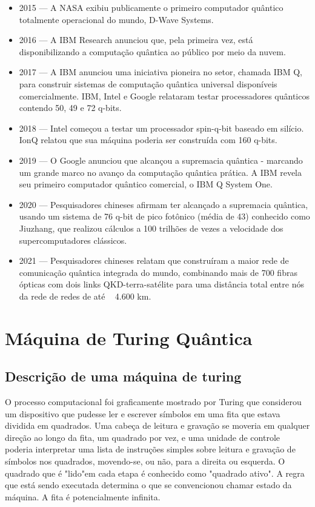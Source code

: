 \documentclass[12pt, a4paper, oneside]{article}
\begin{document}
\begin{itemize}
\item 2015 — A NASA exibiu publicamente o primeiro computador quântico totalmente operacional do mundo, D-Wave Systems.
\item 2016 — A IBM Research anunciou que, pela primeira vez, está disponibilizando a computação quântica ao público por meio da nuvem.
\item 2017 — A IBM anunciou uma iniciativa pioneira no setor, chamada IBM Q, para construir sistemas de computação quântica universal disponíveis comercialmente. IBM, Intel e Google relataram testar processadores quânticos contendo 50, 49 e 72 q-bits.
\item 2018 — Intel começou a testar um processador spin-q-bit baseado em silício. IonQ relatou que sua máquina poderia ser construída com 160 q-bits.
\item 2019 — O Google anunciou que alcançou a supremacia quântica - marcando um grande marco no avanço da computação quântica prática. A IBM revela seu primeiro computador quântico comercial, o IBM Q System One. 
\item 2020 — Pesquisadores chineses afirmam ter alcançado a supremacia quântica, usando um sistema de 76 q-bit de pico fotônico (média de 43) conhecido como Jiuzhang, que realizou cálculos a 100 trilhões de vezes a velocidade dos supercomputadores clássicos. 
\item 2021 — Pesquisadores chineses relatam que construíram a maior rede de comunicação quântica integrada do mundo, combinando mais de 700 fibras ópticas com dois links QKD-terra-satélite para uma distância total entre nós da rede de redes de até ~ 4.600 km.
\flushright[4] [6]
\end{itemize}

\section{Máquina de Turing Quântica}

\subsection{Descrição de uma máquina de turing}

\par O processo computacional foi graficamente mostrado por Turing que considerou um dispositivo que pudesse ler e escrever símbolos em uma fita que estava dividida em quadrados.
Uma cabeça de leitura e gravação se moveria em qualquer direção ao longo da fita, um
quadrado por vez, e uma unidade de controle poderia interpretar uma lista de instruções
simples sobre leitura e gravação de símbolos nos quadrados, movendo-se, ou não, para a
direita ou esquerda. O quadrado que é "lido"em cada etapa é conhecido como "quadrado
ativo". A regra que está sendo executada determina o que se convencionou chamar estado
da máquina. A fita é potencialmente infinita.\\
\end{document}
